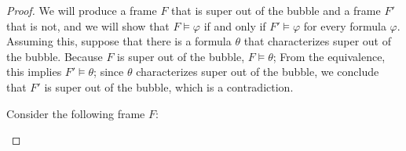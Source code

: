 \documentclass[10pt,a4paper]{amsart}
\begin{document}
\begin{proof}
    We will produce a frame $F$ that is super out of the bubble and a frame $F'$ that is not, and we will show that $F \vDash \varphi$ if and only if $F' \vDash \varphi$ for every formula $\varphi$. Assuming this, suppose that there is a formula $\theta$ that characterizes super out of the bubble. Because $F$ is super out of the bubble, $F \vDash \theta$; From the equivalence, this implies $F' \vDash \theta$; since $\theta$ characterizes super out of the bubble, we conclude that $F'$ is super out of the bubble, which is a contradiction.

    Consider the following frame $F$:
    \begin{center}
        \begin{tikzpicture}[x=0.75pt,y=0.75pt,yscale=-.8,xscale=.8]
        

\end{tikzpicture}
\end{center}
\end{proof}
\end{document}
